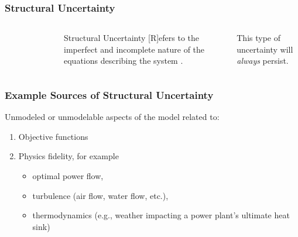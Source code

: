 \begin{frame}
    \frametitle{Structural Uncertainty}

    \begin{columns}
        \column[t]{4cm}
        \begin{figure}
            \centering
        \end{figure}

        \column[t]{6cm}
        \begin{block}{Structural Uncertainty}
            [R]efers to the imperfect and incomplete nature of the equations describing the system \cite{decarolis_using_2011}.
        \end{block}
        
        This type of uncertainty will \textit{always} persist.
    \end{columns}

\end{frame}

\begin{frame}
    \frametitle{Example Sources of Structural Uncertainty}

    Unmodeled or unmodelable aspects of the model related to:

    \begin{enumerate}
        \item Objective functions
        \item Physics fidelity, for example
        \begin{itemize}
            \item optimal power flow,
            \item turbulence (air flow, water flow, etc.),
            \item thermodynamics (e.g., weather impacting a power plant's ultimate heat sink)
        \end{itemize} 
    \end{enumerate}

\end{frame}

